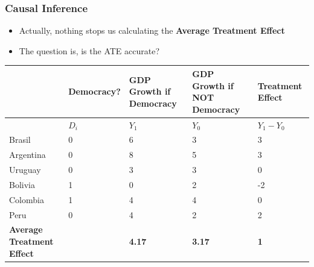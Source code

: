 \documentclass[xcolor=x11names,compress]{beamer}\usepackage[]{graphicx}\usepackage[]{color}
\renewcommand{\(}{\begin{columns}}
\renewcommand{\)}{\end{columns}}
\newcommand{\<}[1]{\begin{column}{#1}}
\renewcommand{\>}{\end{column}}
\begin{document}
\begin{frame}
\frametitle{Causal Inference}
\begin{itemize}
\item Actually, nothing stops us calculating the \textbf{Average Treatment Effect}
\pause
\item The question is, is the ATE accurate?
\pause
\end{itemize}
\scriptsize
\begin{table}[htbp]
  \centering
    \begin{tabular}{|p{1.8cm}|p{1.8cm}|p{2cm}|p{2cm}|p{2cm}|}
    \hline
          & \multicolumn{1}{p{1.8cm}|}{Democracy?} & \multicolumn{1}{p{2cm}|}{GDP Growth if Democracy} & \multicolumn{1}{p{2.2cm}|}{GDP Growth if NOT Democracy} & \textbf{Treatment Effect} \bigstrut\\
    \hline
          & \multicolumn{1}{p{1.8cm}|}{$D_i$} & \multicolumn{1}{p{2cm}|}{$Y_1$} & \multicolumn{1}{p{2.2cm}|}{$Y_0$} & \multicolumn{1}{p{1.8cm}|}{$Y_{1} - Y_{0}$} \bigstrut\\
    \hline
    Brasil & 0 & 6     & 3     & 3 \bigstrut\\
    \hline
    Argentina & 0 & 8    & 5     & 3 \bigstrut\\
    \hline
    Uruguay & 0 & 3 & 3 & 0  \bigstrut\\
    \hline
    Bolivia & 1 & 0     & 2     & -2 \bigstrut\\
    \hline
    Colombia & 1 & 4    & 4    & 0 \bigstrut\\
    \hline
    Peru & 0 & 4     & 2     & 2 \bigstrut\\
    \hline
    \textbf{Average Treatment Effect} & & \textbf{4.17} & \textbf{3.17} & \textbf{1} \bigstrut\\
    \hline
    \end{tabular}%
  \label{tab:addlabel}%
\end{table}%
\normalsize
\end{frame}
\end{document}

